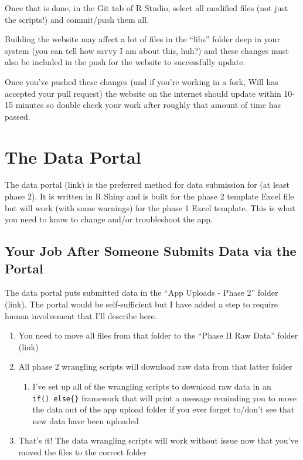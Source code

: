 \documentclass[
  letterpaper,
  oneside,
  open=any]{scrbook}
\providecommand{\tightlist}{%
  \setlength{\itemsep}{0pt}\setlength{\parskip}{0pt}}\usepackage{longtable,booktabs,array}
\begin{document}
Once that is done, in the Git tab of R Studio, select all modified files
(not just the scripts!) and commit/push them all.

Building the website may affect a lot of files in the ``libs'' folder
deep in your system (you can tell how savvy I am about this, huh?) and
these changes must also be included in the push for the website to
successfully update.

Once you've pushed these changes (and if you're working in a fork, Will
has accepted your pull request) the website on the internet should
update within 10-15 minutes so double check your work after roughly that
amount of time has passed.

\chapter{The Data Portal}\label{the-data-portal}

The data portal (link) is the preferred method for data submission for
(at least phase 2). It is written in R Shiny and is built for the phase
2 template Excel file but will work (with some warnings) for the phase 1
Excel template. This is what you need to know to change and/or
troubleshoot the app.

\section{Your Job After Someone Submits Data via the
Portal}\label{your-job-after-someone-submits-data-via-the-portal}

The data portal puts submitted data in the ``App Uploads - Phase 2''
folder (link). The portal would be self-sufficient but I have added a
step to require human involvement that I'll describe here.

\begin{enumerate}
\def\labelenumi{\arabic{enumi}.}
\item
  You need to move all files from that folder to the ``Phase II Raw
  Data'' folder (link)
\item
  All phase 2 wrangling scripts will download raw data from that latter
  folder

  \begin{enumerate}
  \def\labelenumii{\alph{enumii}.}
  \tightlist
  \item
    I've set up all of the wrangling scripts to download raw data in an
    \texttt{if()\ else\{\}} framework that will print a message
    reminding you to move the data out of the app upload folder if you
    ever forget to/don't see that new data have been uploaded
  \end{enumerate}
\item
  That's it! The data wrangling scripts will work without issue now that
  you've moved the files to the correct folder
\end{enumerate}
\end{document}
